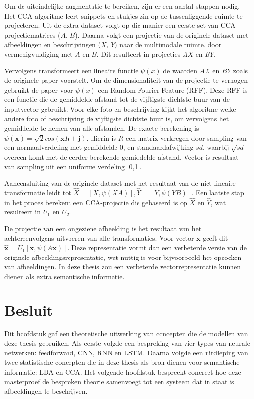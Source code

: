 Om de uiteindelijke augmentatie te bereiken, zijn er een aantal stappen nodig. Het CCA-algoritme leert snippets en stukjes zin op de tussenliggende ruimte te projecteren. Uit de extra dataset volgt op die manier een eerste set van CCA-projectiematrices ($A$, $B$). Daarna volgt een projectie van de originele dataset met afbeeldingen en beschrijvingen ($X$, $Y$) naar de multimodale ruimte, door vermenigvuldiging met $A$ en $B$. Dit resulteert in projecties $AX$ en $BY$. 

Vervolgens transformeert een lineaire functie $\psi(x)$ de waarden $AX$ en $BY$ zoals de originele paper voorstelt.
Om de dimensionaliteit van de projectie te verhogen gebruikt de paper voor $\psi(x)$ een Random Fourier Feature (RFF). Deze RFF is een functie die de gemiddelde afstand tot de vijftigste dichtste buur van de inputvector gebruikt. Voor elke foto en beschrijving kijkt het algoritme welke andere foto of beschrijving de vijftigste dichtste buur is, om vervolgens het gemiddelde te nemen van alle afstanden. De exacte berekening is $\psi(\mathbf{x})=\sqrt{2}cos(\mathbf{x}R+\mathbf{j})$. Hierin is $R$ een matrix verkregen door sampling van een normaalverdeling met gemiddelde 0, en standaardafwijking $sd$, waarbij $\sqrt{sd}$ overeen komt met de eerder berekende gemiddelde afstand. Vector  is resultaat van sampling uit een uniforme verdeling [0,1].

Aaneensluiting van de originele dataset met het resultaat van de niet-lineaire transformatie leidt tot $\hat{X} = [X, \psi(XA)], \hat{Y} = [Y, \psi(YB)]$. Een laatste stap in het proces berekent een CCA-projectie die gebaseerd is op $\hat{X}$ en $\hat{Y}$, wat resulteert in $U_1$ en $U_2$.

De projectie van een ongeziene afbeelding is het resultaat van het achtereenvolgens uitvoeren van alle transformaties. Voor vector $\mathbf{x}$ geeft dit $\mathbf{\hat{x}} = U_1[\mathbf{x}, \psi(A\mathbf{x})]$. Deze representatie vormt dan een verbeterde versie van de originele afbeeldingsrepresentatie, wat nuttig is voor bijvoorbeeld het opzoeken van afbeeldingen. In deze thesis zou een verbeterde vectorrepresentatie kunnen dienen als extra semantische informatie. 

\section{Besluit}
Dit hoofdstuk gaf een theoretische uitwerking van concepten die de modellen van deze thesis gebruiken. Als eerste volgde een bespreking van vier types van neurale netwerken: feedforward, CNN, RNN en LSTM. Daarna volgde een uitdieping van twee statistische concepten die in deze thesis als bron dienen voor semantische informatie: LDA en CCA. Het volgende hoofdstuk bespreekt concreet hoe deze masterproef de besproken theorie samenvoegt tot een systeem dat in staat is afbeeldingen te beschrijven.
